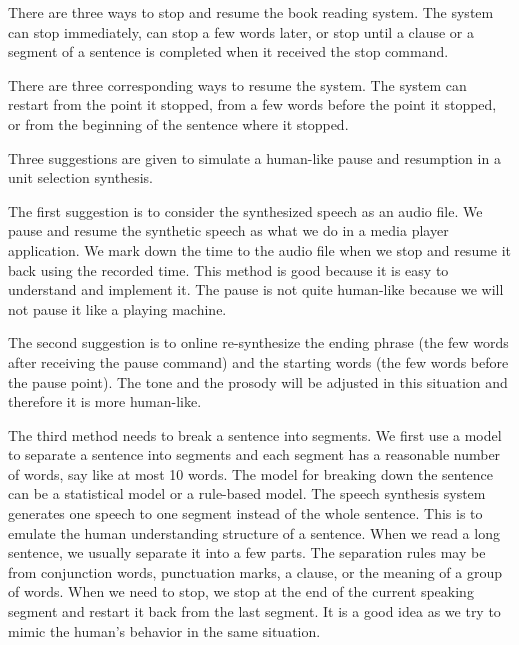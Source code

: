 \documentclass[12pt]{article}
\newenvironment{problem}[2][Problem]{\begin{trivlist}
\item[\hskip \labelsep {\bfseries #1}\hskip \labelsep {\bfseries #2.}]}{\end{trivlist}}
\begin{document}
\begin{problem}{2.3}
    There are three ways to stop and resume the book reading system. 
    The system can stop immediately, can stop a few words later, or stop until 
    a clause or a segment of a sentence is completed when it received the stop command. 
    
    There are three corresponding ways to resume the system. 
    The system can restart from the point it stopped, from a few words before 
    the point it stopped, or from the beginning of the sentence where it stopped. 
    
    Three suggestions are given to simulate a human-like pause and resumption in
    a unit selection synthesis.

    The first suggestion is to consider the synthesized speech as an audio file.
    We pause and resume the synthetic speech as what we do in a media player
    application. We mark down the time to the audio file when we stop and resume
    it back using the recorded time.
    This method is good because it is easy to understand and implement it. 
    The pause is not quite human-like because we will not pause it like a playing machine. 
    
    
    The second suggestion is to online re-synthesize the ending phrase 
    (the few words after receiving the pause command) and the starting words 
    (the few words before the pause point). 
    The tone and the prosody will be adjusted in this situation and therefore 
    it is more human-like. 
    
    The third method needs to break a sentence into segments. 
    We first use a model to separate a sentence into segments and each segment 
    has a reasonable number of words, say like at most 10 words. 
    The model for breaking down the sentence can be a statistical model or a 
    rule-based model. 
    The speech synthesis system generates one speech to one segment instead of 
    the whole sentence.
    This is to emulate the human understanding structure of a sentence. 
    When we read a long sentence, we usually separate it into a few parts. 
    The separation rules may be from conjunction words, punctuation marks, 
    a clause, or the meaning of a group of words. 
    When we need to stop, we stop at the end of the current speaking segment 
    and restart it back from the last segment. It is a good idea as we try to mimic
    the human's behavior in the same situation.
\end{problem}
\end{document}
